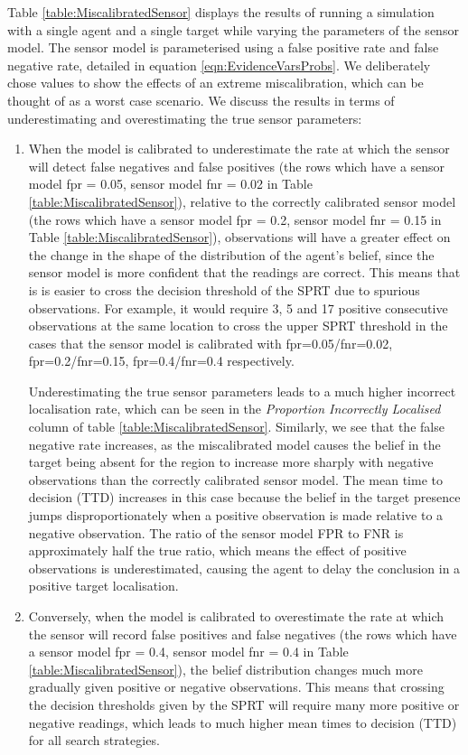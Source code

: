 Table \ref{table:MiscalibratedSensor} displays the results of running a simulation with a single agent and a single target while varying the parameters of the sensor model. The sensor model is parameterised using a false positive rate and false negative rate, detailed in equation \ref{eqn:EvidenceVarsProbs}. We deliberately chose values to show the effects of an extreme miscalibration, which can be thought of as a worst case scenario. We discuss the results in terms of underestimating and overestimating the true sensor parameters:
\begin{enumerate}
    \item When the model is calibrated to underestimate the rate at which the sensor will detect false negatives and false positives (the rows which have a sensor model fpr = 0.05, sensor model fnr = 0.02 in Table \ref{table:MiscalibratedSensor}), relative to the correctly calibrated sensor model (the rows which have a sensor model fpr = 0.2, sensor model fnr = 0.15 in Table \ref{table:MiscalibratedSensor}), observations will have a greater effect on the change in the shape of the distribution of the agent's belief, since the sensor model is more confident that the readings are correct. This means that is is easier to cross the decision threshold of the SPRT due to spurious observations. For example, it would require 3, 5 and 17 positive consecutive observations at the same location to cross the upper SPRT threshold in the cases that the sensor model is calibrated with fpr=0.05/fnr=0.02, fpr=0.2/fnr=0.15, fpr=0.4/fnr=0.4 respectively.
    
    Underestimating the true sensor parameters leads to a much higher incorrect localisation rate, which can be seen in the \textit{Proportion Incorrectly Localised} column of table \ref{table:MiscalibratedSensor}. Similarly, we see that the false negative rate increases, as the miscalibrated model causes the belief in the target being absent for the region to increase more sharply with negative observations than the correctly calibrated sensor model. The mean time to decision (TTD) increases in this case because the belief in the target presence jumps disproportionately when a positive observation is made relative to a negative observation. The ratio of the sensor model FPR to FNR is approximately half the true ratio, which means the effect of positive observations is underestimated, causing the agent to delay the conclusion in a positive target localisation.
    \item Conversely, when the model is calibrated to overestimate the rate at which the sensor will record false positives and false negatives (the rows which have a sensor model fpr = 0.4, sensor model fnr = 0.4 in Table \ref{table:MiscalibratedSensor}), the belief distribution changes much more gradually given positive or negative observations. This means that crossing the decision thresholds given by the SPRT will require many more positive or negative readings, which leads to much higher mean times to decision (TTD) for all search strategies.
\end{enumerate}